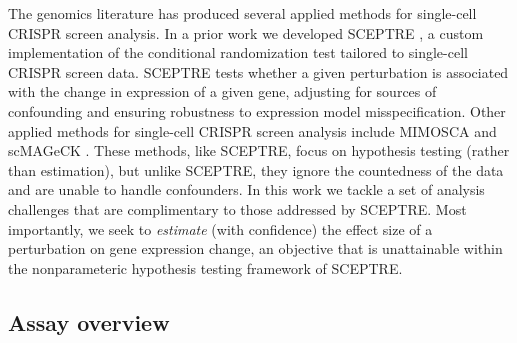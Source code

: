 \documentclass[12pt]{article}
\begin{document}
The genomics literature has produced several applied methods for single-cell CRISPR screen analysis. In a prior work we developed SCEPTRE \cite{Barry2020}, a custom implementation of the conditional randomization test \cite{Candes2018, Liu2021} tailored to single-cell CRISPR screen data. SCEPTRE tests whether a given perturbation is associated with the change in expression of a given gene, adjusting for sources of confounding and ensuring robustness to expression model misspecification. Other applied methods for single-cell CRISPR screen analysis include MIMOSCA \cite{Dixit2016} and scMAGeCK \cite{Yang2019}. These methods, like SCEPTRE, focus on hypothesis testing (rather than estimation), but unlike SCEPTRE, they ignore the countedness of the data and are unable to handle confounders. In this work we tackle a set of analysis challenges that are complimentary to those addressed by SCEPTRE. Most importantly, we seek to \textit{estimate} (with confidence) the effect size of a perturbation on gene expression change, an objective that is unattainable within the nonparameteric hypothesis testing framework of SCEPTRE.

\subsection{Assay overview}
\end{document}
